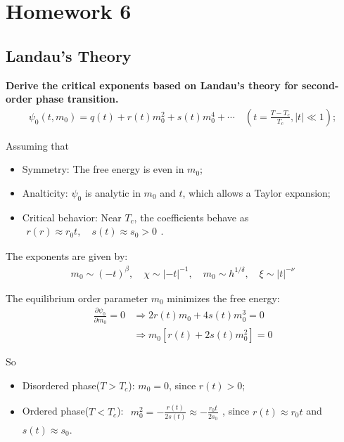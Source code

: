 \documentclass[../../main.tex]{subfiles}
\begin{document}
\section{Homework 6}
\subsection{Landau's Theory}
\textbf{Derive the critical exponents based on Landau's theory for second-order phase transition. 
  \begin{align*}
    \psi_{0}(t,m_{0}) = q(t) + r(t)m_{0}^{2} + s(t)m_{0}^{4} + \cdots\quad \left(t = \frac{T-T_{c}}{T_{c}},|t|\ll 1\right);
  \end{align*}}

  Assuming that 
  \begin{itemize}
    \item Symmetry: The free energy is even in $m_{0}$;
    \item Analticity: $\psi_{0}$ is analytic in $m_{0}$ and $t$, which allows a Taylor expansion;
    \item Critical behavior: Near $T_{c}$, the coefficients behave as $\begin{aligned}
      r(r)\approx r_{0}t,\quad s(t)\approx s_{0}>0
    \end{aligned}$. 
  \end{itemize}

  The exponents are given by:
  \begin{align*}
    m_{0}\sim (-t)^{\beta}, \quad \chi\sim |-t|^{-1},\quad m_{0}\sim h^{1/\delta},\quad \xi\sim|t|^{-\nu}
  \end{align*}

  The equilibrium order parameter $m_{0}$ minimizes the free energy:
  \begin{align*}
    \frac{\partial\psi_{0}}{\partial m_{0}} = 0&\Rightarrow 2r(t)m_{0} + 4s(t)m_{0}^{3} = 0\\
    &\Rightarrow m_{0}[r(t) + 2s(t)m_{0}^{2}] = 0
  \end{align*}

  So
  \begin{itemize}
    \item Disordered phase($T>T_{c}$): $m_{0}=0$, since $r(t)>0$;
    \item Ordered phase($T<T_{c}$): $\begin{aligned}
      m_{0}^{2} = -\frac{r(t)}{2s(t)}\approx -\frac{r_{0}t}{2s_{0}}
    \end{aligned}$, since $r(t)\approx r_{0}t$ and $s(t)\approx s_{0}$.
  \end{itemize}
\end{document}
